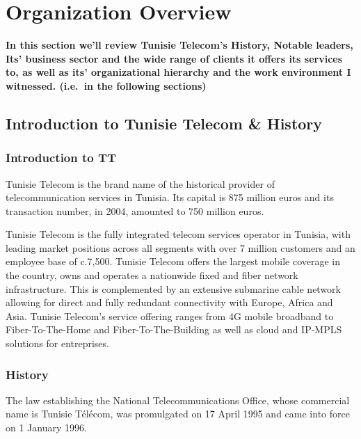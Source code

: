 \chapter{Organization Overview} %
\label{chap:org}
\textbf{In this section we'll review Tunisie Telecom's History, Notable leaders, Its' business sector and the wide range of clients it offers its services to, as well as its' organizational hierarchy and the work environment I witnessed.  (i.e.\ in the following sections)}
\section{Introduction to Tunisie Telecom \& History} %

{}%
\subsection{Introduction to TT}%
Tunisie Telecom is the brand name of the historical provider of telecommunication services in Tunisia. Its capital is 875 million euros and its transaction number, in 2004, amounted to 750 million euros.

Tunisie Telecom is the fully integrated telecom services operator in Tunisia, with leading market positions across all segments with over 7 million customers and an employee base of c.7,500. Tunisie Telecom offers the largest mobile coverage in the country, owns and operates a nationwide fixed and fiber network infrastructure. This is complemented by an extensive submarine cable network allowing for direct and fully redundant connectivity with Europe, Africa and Asia. Tunisie Telecom’s service offering ranges from 4G mobile broadband to Fiber-To-The-Home and Fiber-To-The-Building as well as cloud and IP-MPLS solutions for entreprises.

\subsection{History}
The law establishing the National Telecommunications Office, whose commercial name is Tunisie Télécom, was promulgated on 17 April 1995 and came into force on 1 January 1996.


